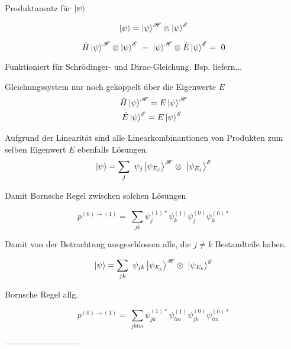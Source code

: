 \documentclass[12pt]{article}
\begin{document}
Produktansatz für $\ket{\psi}$

\begin{equation} 
\ket{\psi} = \ket{\psi}^{\mathscr{H}} \otimes \ket{\psi}^{\mathscr{E}}
\end{equation}

\begin{equation} 
\hat{H}\ket{\psi}^{\mathscr{H}} \otimes \ket{\psi}^{\mathscr{E}} 
\ - \ 
\ket{\psi}^{\mathscr{H}} \otimes \hat{E}\ket{\psi}^{\mathscr{E}} =\ 0
\end{equation}

Funktioniert für Schrödinger- und Dirac-Gleichung. Bsp. liefern...


Gleichungssystem nur noch gekoppelt über die Eigenwerte $E$
\begin{equation}
\begin{split}
\hat{H}\ket{\psi}^{\mathscr{H}} = E\ket{\psi}^{\mathscr{H}}\\
\hat{E}\ket{\psi}^{\mathscr{E}} = E\ket{\psi}^{\mathscr{E}}\ \ 
\end{split}
\end{equation}

Aufgrund der Linearität sind alle Linearkombinantionen von Produkten zum selben Eigenwert $E$ ebenfalls Lösungen.
\begin{equation}
\ket{\psi} = \sum_j\ \psi_j \ket{\psi_{E_j}}^{\mathscr{H}} \otimes\ \ket{\psi_{E_j}}^{\mathscr{E}}
\end{equation}


Damit Bornsche Regel zwischen solchen Lösungen

\begin{equation} 
p^{(0)\rightarrow(1)} =\ \sum_{jk} \psi_j^{(1)*}\psi_k^{(1)}\psi_j^{(0)}\psi_k^{(0)*}
\end{equation}

Damit von der Betrachtung ausgeschlossen alle, die $j \neq k$ Bestandteile haben.

\begin{equation}
\ket{\psi} = \sum_{jk}\ \psi_{jk} \ket{\psi_{E_j}}^{\mathscr{H}} \otimes\ \ket{\psi_{E_k}}^{\mathscr{E}}
\end{equation}

Bornsche Regel allg.

\begin{equation} 
p^{(0)\rightarrow(1)} =\ \sum_{jklm} \psi_{jk}^{(1)*}\psi_{lm}^{(1)}\psi_{jk}^{(0)}\psi_{lm}^{(0)*}
\end{equation}


---------------------------
\end{document}
